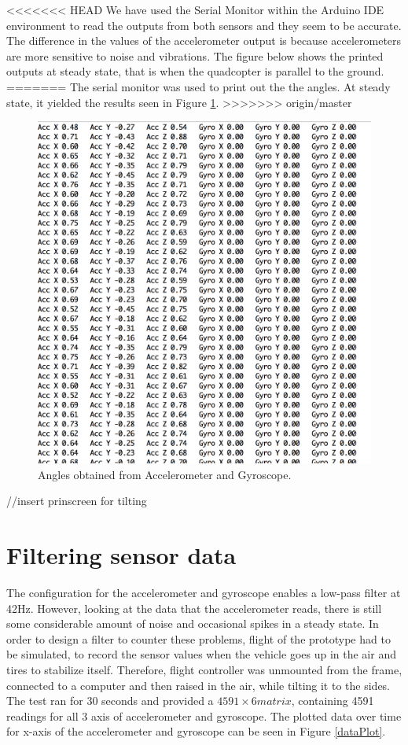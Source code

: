 <<<<<<< HEAD
We have used the Serial Monitor within the Arduino IDE environment to read the outputs from both sensors and they seem to be accurate. The difference in the values of the accelerometer output is because accelerometers are more sensitive to noise and vibrations. The figure below shows the printed outputs at steady state, that is when the quadcopter is parallel to the ground.
=======
The serial monitor was used to print out the the angles. At steady state, it yielded the results seen in Figure \ref{angles}.
>>>>>>> origin/master

\begin{figure}[H]
  \centering
    \includegraphics[width=1\textwidth]{images/accgy.png}
	\caption{Angles obtained from Accelerometer and Gyroscope.}
	\label{angles}
\end{figure}

//insert prinscreen for tilting 

\section{Filtering sensor data}
The configuration for the accelerometer and gyroscope enables a low-pass filter at 42Hz. However, looking at the data that the accelerometer reads, there is still some considerable amount of noise and occasional spikes in a steady state. In order to design a filter to counter these problems, flight of the prototype had to be simulated, to record the sensor values when the vehicle goes up in the air and tires to stabilize itself. Therefore, flight controller was unmounted from the frame, connected to a computer and then raised in the air, while tilting it to the sides. The test ran for 30 seconds and provided a $4591\times 6 matrix$, containing 4591 readings for all 3 axis of accelerometer and gyroscope. The plotted data over time for x-axis of the accelerometer and gyroscope can be seen in Figure \ref{dataPlot}.

